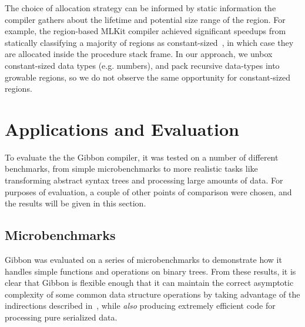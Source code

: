 
The choice of allocation strategy can be informed by static information the
compiler gathers about the lifetime and potential size range of the region. For
example, the region-based MLKit compiler achieved significant speedups from
statically classifying a majority of regions as
constant-sized~\cite{mlkit-retrospective}, in which case they are allocated
inside the procedure stack frame.
%
In our approach, we unbox constant-sized data types (e.g. numbers), and
pack recursive data-types into growable regions, so we do not observe the same
opportunity for constant-sized regions.





\section{Applications and Evaluation}
\label{section:applications}

To evaluate the the Gibbon compiler, it was tested on a number of different
benchmarks, from simple microbenchmarks to more realistic tasks like
transforming abstract syntax trees and processing large amounts of data.
For purposes of evaluation, a couple of other points of comparison were
chosen, and the results will be given in this section.

\subsection{Microbenchmarks}

Gibbon was evaluated on a series of microbenchmarks to demonstrate how it
handles simple functions and operations on binary trees. From these results,
it is clear that Gibbon is flexible enough that it can maintain the
correct asymptotic complexity of some common data structure operations by
taking advantage of the indirections described in~,
while \emph{also} producing extremely efficient code for processing
pure serialized data.

